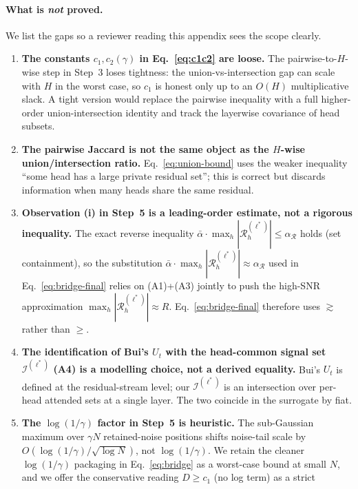 \documentclass{article} %
\begin{document}
\paragraph{What is \emph{not} proved.}
We list the gaps so a reviewer reading this appendix sees the scope
clearly.
\begin{enumerate}
  \item \textbf{The constants $c_1, c_2(\gamma)$ in
  Eq.~\eqref{eq:c1c2} are loose.} The pairwise-to-$H$-wise step in
  Step~3 loses tightness: the union-vs-intersection gap can scale with
  $H$ in the worst case, so $c_1$ is honest only up to an $O(H)$
  multiplicative slack. A tight version would replace the pairwise
  inequality with a full higher-order union-intersection identity and
  track the layerwise covariance of head subsets.
  \item \textbf{The pairwise Jaccard is not the same object as the
  $H$-wise union/intersection ratio.} Eq.~\eqref{eq:union-bound} uses
  the weaker inequality ``some head has a large private residual
  set''; this is correct but discards information when many heads share
  the same residual.
  \item \textbf{Observation (i) in Step~5 is a leading-order estimate,
  not a rigorous inequality.} The exact reverse inequality $\bar\alpha
  \cdot \max_h |\mathcal{R}^{(\ell^*)}_h| \leq \alpha_{\mathcal{R}}$
  holds (set containment), so the substitution $\bar\alpha \cdot \max_h
  |\mathcal{R}^{(\ell^*)}_h| \approx \alpha_{\mathcal{R}}$ used in
  Eq.~\eqref{eq:bridge-final} relies on (A1)+(A3) jointly to push the
  high-SNR approximation $\max_h |\mathcal{R}^{(\ell^*)}_h| \approx R$.
  Eq.~\eqref{eq:bridge-final} therefore uses $\gtrsim$ rather than
  $\geq$.
  \item \textbf{The identification of Bui's $U_t$ with the head-common
  signal set $\mathcal{I}^{(\ell^*)}$ (A4) is a modelling choice, not a
  derived equality.} Bui's $U_t$ is defined at the residual-stream
  level; our $\mathcal{I}^{(\ell^*)}$ is an intersection over per-head
  attended sets at a single layer. The two coincide in the surrogate by
  fiat.
  \item \textbf{The $\log(1/\gamma)$ factor in Step~5 is heuristic.} The
  sub-Gaussian maximum over $\gamma N$ retained-noise positions shifts
  noise-tail scale by $O(\log(1/\gamma) / \sqrt{\log N})$, not
  $\log(1/\gamma)$. We retain the cleaner $\log(1/\gamma)$ packaging in
  Eq.~\eqref{eq:bridge} as a worst-case bound at small $N$, and we offer
  the conservative reading $D \geq c_1$ (no log term) as a strict

\end{enumerate}
\end{document}
